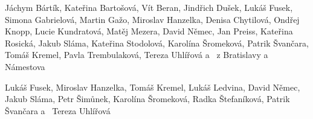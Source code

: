 \noindent
{%
}
\smallskip\par\noindent
Jáchym Bártík,
Kateřina Bartošová,
Vít Beran,
Jindřich Dušek,
Lukáš Fusek,
Simona Gabrielová,
Martin Gažo,
Miroslav Hanzelka,
Denisa Chytilová,
Ondřej Knopp,
Lucie Kundratová,
Matěj Mezera,
David Němec,
Jan Preiss,
Kateřina Rosická,
Jakub Sláma,
Kateřina Stodolová,
Karolína Šromeková,
Patrik Švančara,
Tomáš Kremel,
Pavla Trembulaková,
Tereza Uhlířová a~%
{} z Bratislavy a Námestova
\medskip\par\noindent
{}
\smallskip\par\noindent
Lukáš Fusek,
Miroslav Hanzelka,
Tomáš Kremel,
Lukáš Ledvina,
David Němec,
Jakub Sláma,
Petr Šimůnek,
Karolína Šromeková,
Radka Štefaníková,
Patrik Švančara a~%
Tereza Uhlířová
